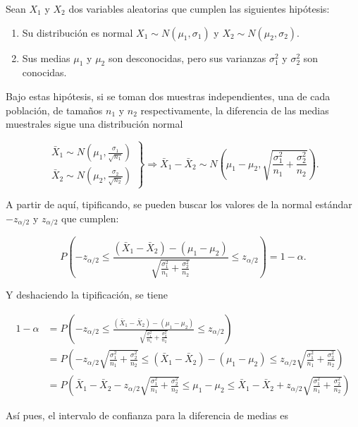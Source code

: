 \documentclass[
  spanish,
  a4paper,
]{scrreport}
\providecommand{\tightlist}{%
  \setlength{\itemsep}{0pt}\setlength{\parskip}{0pt}}
\theoremstyle{plain}
\theoremstyle{definition}
\theoremstyle{definition}
\theoremstyle{remark}
\begin{document}
Sean \(X_1\) y \(X_2\) dos variables aleatorias que cumplen las
siguientes hipótesis:

\begin{enumerate}
\def\labelenumi{\arabic{enumi}.}
\tightlist
\item
  Su distribución es normal \(X_1\sim N(\mu_1,\sigma_1)\) y
  \(X_2\sim N(\mu_2,\sigma_2)\).
\item
  Sus medias \(\mu_1\) y \(\mu_2\) son desconocidas, pero sus varianzas
  \(\sigma^2_1\) y \(\sigma^2_2\) son conocidas.
\end{enumerate}

Bajo estas hipótesis, si se toman dos muestras independientes, una de
cada población, de tamaños \(n_1\) y \(n_2\) respectivamente, la
diferencia de las medias muestrales sigue una distribución normal

\[
\left.
\begin{array}{l}
\bar{X}_1\sim N\left(\mu_1,\frac{\sigma_1}{\sqrt{n_1}} \right)\\
\bar{X}_2\sim N\left(\mu_2,\frac{\sigma_2}{\sqrt{n_2}} \right)
\end{array}
\right\}
\Rightarrow
\bar{X}_1-\bar{X}_2 \sim N\left(\mu_1-\mu_2,\sqrt{\frac{\sigma^2_1}{n_1}+\frac{\sigma^2_2}{n_2}}\right).
\]

A partir de aquí, tipificando, se pueden buscar los valores de la normal
estándar \(-z_{\alpha/2}\) y \(z_{\alpha/2}\) que cumplen:

\[
P\left(-z_{\alpha/2}\leq \frac{(\bar{X}_1-\bar{X}_2)-(\mu_1-\mu_2)}{\sqrt{\frac{\sigma^2_1}{n_1}+\frac{\sigma^2_2}{n_2}}} \leq z_{\alpha/2}\right) = 1-\alpha.
\]

Y deshaciendo la tipificación, se tiene

\begin{align*}
1-\alpha 
&= P\left(-z_{\alpha/2}\leq \frac{(\bar{X}_1-\bar{X}_2)-(\mu_1-\mu_2)}{\sqrt{\frac{\sigma^2_1}{n_1}+\frac{\sigma^2_2}{n_2}}} \leq z_{\alpha/2}\right) \\
&= P\left(-z_{\alpha/2}\sqrt{\frac{\sigma^2_1}{n_1}+\frac{\sigma^2_2}{n_2}}\leq (\bar{X}_1-\bar{X}_2)-(\mu_1-\mu_2)\leq z_{\alpha/2}\sqrt{\frac{\sigma^2_1}{n_1}+\frac{\sigma^2_2}{n_2}}\right) \\
&= P\left(\bar{X}_1-\bar{X}_2 - z_{\alpha/2}\sqrt{\frac{\sigma^2_1}{n_1}+\frac{\sigma^2_2}{n_2}}\leq \mu_1-\mu_2\leq \bar{X}_1-\bar{X}_2 + z_{\alpha/2}\sqrt{\frac{\sigma^2_1}{n_1}+\frac{\sigma^2_2}{n_2}}\right)
\end{align*}

Así pues, el intervalo de confianza para la diferencia de medias es
\end{document}

